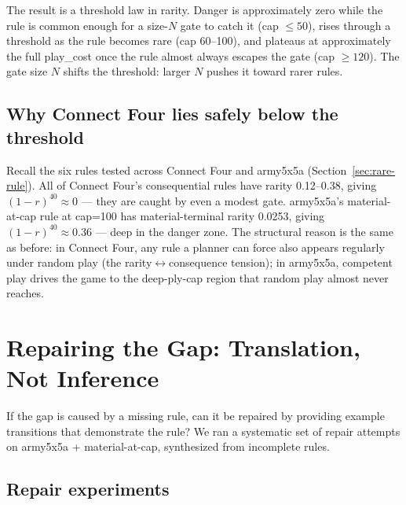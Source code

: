 \documentclass[11pt]{article}
\theoremstyle{remark}
\begin{document}
The result is a threshold law in rarity. Danger is approximately zero while the rule is common enough for a size-$N$ gate to catch it (cap $\leq 50$), rises through a threshold as the rule becomes rare (cap 60--100), and plateaus at approximately the full play\_cost once the rule almost always escapes the gate (cap $\geq 120$). The gate size $N$ shifts the threshold: larger $N$ pushes it toward rarer rules.

\subsection{Why Connect Four lies safely below the threshold}

Recall the six rules tested across Connect Four and army5x5a (Section~\ref{sec:rare-rule}). All of Connect Four's consequential rules have rarity 0.12--0.38, giving $(1-r)^{40} \approx 0$ --- they are caught by even a modest gate. army5x5a's material-at-cap rule at cap=100 has material-terminal rarity 0.0253, giving $(1-r)^{40} \approx 0.36$ --- deep in the danger zone. The structural reason is the same as before: in Connect Four, any rule a planner can force also appears regularly under random play (the rarity$\leftrightarrow$consequence tension); in army5x5a, competent play drives the game to the deep-ply-cap region that random play almost never reaches.

\section{Repairing the Gap: Translation, Not Inference}
\label{sec:repair}

If the gap is caused by a missing rule, can it be repaired by providing example transitions that demonstrate the rule? We ran a systematic set of repair attempts on army5x5a + material-at-cap, synthesized from incomplete rules.

\subsection{Repair experiments}
\end{document}
